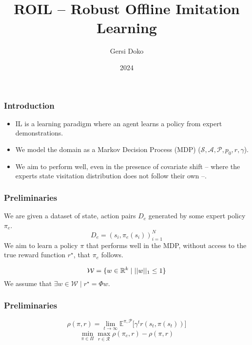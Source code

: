 \documentclass{beamer}
\title{ROIL -- Robust Offline Imitation Learning}
\author{Gersi Doko}
\institute{Dept. of Computer Science, University of New Hampshire}
\date{2024}
\begin{document}
\frame{\titlepage}

\begin{frame}
\frametitle{Introduction}
	\begin{itemize}
		\item IL is a learning paradigm where an agent learns a policy from expert demonstrations.
		\item We model the domain as a Markov Decision Process (MDP) ($\mathcal{S}, \mathcal{A}, \mathcal{P}, p_0, r, \gamma$).
		\item We aim to perform well, even in the presence of covariate shift -- where the experts state visitation distribution does not follow their own --.
	\end{itemize}
\end{frame}

\begin{frame}
	\frametitle{Preliminaries}
	We are given a dataset of state, action pairs $D_e$ generated by some expert policy $\pi_e$.
	\[ D_e = (s_i, \pi_e(s_i))_{i=1}^N \]
	We aim to learn a policy $\pi$ that performs well in the MDP, without access to the true reward function $r^\star$,
	that $\pi_e$ follows.

	\[ \mathcal{W} = \lbrace w \in \mathbb{R}^k \mid \lvert \lvert w \rvert \rvert_1 \leq 1 \rbrace \]
	We assume that $\exists w \in \mathcal{W} \mid r^\star = \Phi w$.

\end{frame}

\begin{frame}
	\frametitle{Preliminaries}
	\[ \rho(\pi, r) = \lim_{t \to \infty} \mathbb{E}^{\pi, \mathcal{P}} \lbrack \gamma^t r(s_t, \pi(s_t)) \rbrack \]
	\[ \min_{\pi \in \Pi} \max_{r \in \mathcal{R}} \rho(\pi_e, r) - \rho(\pi, r)\]
\end{frame}
\end{document}
